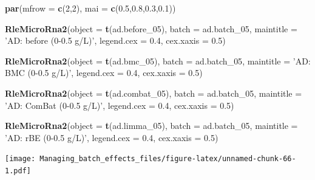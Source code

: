 \documentclass[]{book}
\newenvironment{Shaded}{\begin{snugshade}}{\end{snugshade}}
\newcommand{\KeywordTok}[1]{\textcolor[rgb]{0.13,0.29,0.53}{\textbf{#1}}}
\newcommand{\DataTypeTok}[1]{\textcolor[rgb]{0.13,0.29,0.53}{#1}}
\newcommand{\DecValTok}[1]{\textcolor[rgb]{0.00,0.00,0.81}{#1}}
\newcommand{\FloatTok}[1]{\textcolor[rgb]{0.00,0.00,0.81}{#1}}
\newcommand{\StringTok}[1]{\textcolor[rgb]{0.31,0.60,0.02}{#1}}
\newcommand{\NormalTok}[1]{#1}
\begin{document}
\begin{Shaded}
\begin{Highlighting}[]
\KeywordTok{par}\NormalTok{(}\DataTypeTok{mfrow =} \KeywordTok{c}\NormalTok{(}\DecValTok{2}\NormalTok{,}\DecValTok{2}\NormalTok{), }\DataTypeTok{mai =} \KeywordTok{c}\NormalTok{(}\FloatTok{0.5}\NormalTok{,}\FloatTok{0.8}\NormalTok{,}\FloatTok{0.3}\NormalTok{,}\FloatTok{0.1}\NormalTok{))}

\KeywordTok{RleMicroRna2}\NormalTok{(}\DataTypeTok{object =} \KeywordTok{t}\NormalTok{(ad.before_}\DecValTok{05}\NormalTok{), }\DataTypeTok{batch =}\NormalTok{ ad.batch_}\DecValTok{05}\NormalTok{, }
             \DataTypeTok{maintitle =} \StringTok{'AD: before (0-0.5 g/L)'}\NormalTok{, }\DataTypeTok{legend.cex =} \FloatTok{0.4}\NormalTok{, }
             \DataTypeTok{cex.xaxis =} \FloatTok{0.5}\NormalTok{)}

\KeywordTok{RleMicroRna2}\NormalTok{(}\DataTypeTok{object =} \KeywordTok{t}\NormalTok{(ad.bmc_}\DecValTok{05}\NormalTok{), }\DataTypeTok{batch =}\NormalTok{ ad.batch_}\DecValTok{05}\NormalTok{, }
             \DataTypeTok{maintitle =} \StringTok{'AD: BMC (0-0.5 g/L)'}\NormalTok{, }\DataTypeTok{legend.cex =} \FloatTok{0.4}\NormalTok{, }
             \DataTypeTok{cex.xaxis =} \FloatTok{0.5}\NormalTok{)}

\KeywordTok{RleMicroRna2}\NormalTok{(}\DataTypeTok{object =} \KeywordTok{t}\NormalTok{(ad.combat_}\DecValTok{05}\NormalTok{), }\DataTypeTok{batch =}\NormalTok{ ad.batch_}\DecValTok{05}\NormalTok{, }
             \DataTypeTok{maintitle =} \StringTok{'AD: ComBat (0-0.5 g/L)'}\NormalTok{, }\DataTypeTok{legend.cex =} \FloatTok{0.4}\NormalTok{, }
             \DataTypeTok{cex.xaxis =} \FloatTok{0.5}\NormalTok{)}

\KeywordTok{RleMicroRna2}\NormalTok{(}\DataTypeTok{object =} \KeywordTok{t}\NormalTok{(ad.limma_}\DecValTok{05}\NormalTok{), }\DataTypeTok{batch =}\NormalTok{ ad.batch_}\DecValTok{05}\NormalTok{, }
             \DataTypeTok{maintitle =} \StringTok{'AD: rBE (0-0.5 g/L)'}\NormalTok{, }\DataTypeTok{legend.cex =} \FloatTok{0.4}\NormalTok{, }
             \DataTypeTok{cex.xaxis =} \FloatTok{0.5}\NormalTok{)}
\end{Highlighting}
\end{Shaded}

\texttt{[image: Managing\_batch\_effects\_files/figure-latex/unnamed-chunk-66-1.pdf]}
\end{document}
